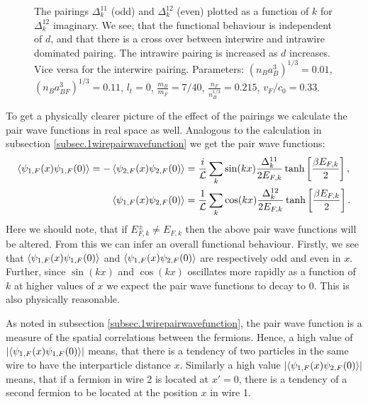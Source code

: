 \begin{figure} 
\begin{center}  
  
\caption{The pairings $\Delta^{11}_k$ (odd) and $\Delta^{12}_k$ (even) plotted as a function of $k$ for $\Delta^{12}_k$ imaginary. We see, that the functional behaviour is independent of $d$, and that there is a cross over between interwire and intrawire dominated pairing. The intrawire pairing is increased as $d$ increases. Vice versa for the interwire pairing. Parameters: $(n_Ba_B^3)^{1/3} = 0.01$, $(n_Ba_{BF}^3)^{1/3} = 0.11$, $l_t = 0$, $\frac{m_B}{m_F} = 7/40$, $\frac{n_F}{n_B^{1/3}} = 0.215$, $v_F/c_0 = 0.33$. }  
\label{fig.pairingkdependT0dvaried}  
\end{center}    
\end{figure}

To get a physically clearer picture of the effect of the pairings we calculate the pair wave functions in real space as well. Analogous to the calculation in subsection \ref{subsec.1wirepairwavefunction} we get the pair wave functions:
\begin{align}
\braket{\psi_{1,F}(x)\psi_{1,F}(0)} = - \braket{\psi_{2,F}(x)\psi_{2,F}(0)} &= \frac{i}{\mathcal{L}}\sum_k \sin(kx) \frac{\Delta^{11}_k}{2E_{F,k}}\tanh\left[\frac{ \beta E_{F,k} }{2}\right], \nonumber \\
\braket{\psi_{1,F}(x)\psi_{2,F}(0)} &= \frac{1}{\mathcal{L}}\sum_k \cos(kx) \frac{\Delta^{12}_k}{2E_{F,k}}\tanh\left[\frac{ \beta E_{F,k} }{2}\right].
\label{eq.2wirespairwavefunctionsDelta12imaginary}
\end{align} 
Here we should note, that if $E^\pm_{F,k} \neq E_{F,k}$ then the above pair wave functions will be altered. From this we can infer an overall functional behaviour. Firstly, we see that $\braket{\psi_{1,F}(x)\psi_{1,F}(0)}$ and $\braket{\psi_{1,F}(x)\psi_{2,F}(0)}$ are respectively odd and even in $x$. Further, since $\sin(kx)$ and $\cos(kx)$ oscillates more rapidly as a function of $k$ at higher values of $x$ we expect the pair wave functions to decay to 0. This is also physically reasonable.  

As noted in subsection \ref{subsec.1wirepairwavefunction}, the pair wave function is a measure of the spatial correlations between the fermions. Hence, a high value of $\left|\braket{\psi_{1,F}(x)\psi_{1,F}(0)}\right|$ means, that there is a tendency of two particles in the same wire to have the interparticle distance $x$. Similarly a high value $\left|\braket{\psi_{1,F}(x)\psi_{2,F}(0)}\right|$ means, that if a fermion in wire 2 is located at $x' = 0$, there is a tendency of a second fermion to be located at the position $x$ in wire 1.  

